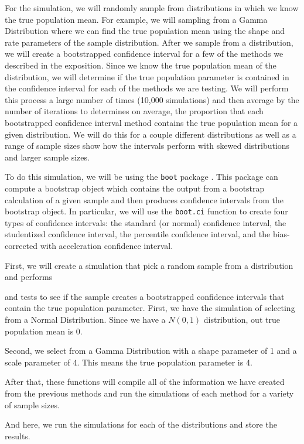 \documentclass[12pt]{article}
\begin{document}
For the simulation, we will randomly sample from distributions in which
we know the true population mean. For example, we will sampling from a
Gamma Distribution where we can find the true population mean using the
shape and rate parameters of the sample distribution. After we sample
from a distribution, we will create a bootstrapped confidence interval
for a few of the methods we described in the exposition. Since we know
the true population mean of the distribution, we will determine if the
true population parameter is contained in the confidence interval for
each of the methods we are testing. We will perform this process a large
number of times (10,000 simulations) and then average by the number of
iterations to determines on average, the proportion that each
bootstrapped confidence interval method contains the true population
mean for a given distribution. We will do this for a couple different
distributions as well as a range of sample sizes show how the intervals
perform with skewed distributions and larger sample sizes.

To do this simulation, we will be using the \texttt{boot} package
\citep{boot}. This package can compute a bootstrap object which contains
the output from a bootstrap calculation of a given sample and then
produces confidence intervals from the bootstrap object. In particular,
we will use the \texttt{boot.ci} function to create four types of
confidence intervals: the standard (or normal) confidence interval, the
studentized confidence interval, the percentile confidence interval, and
the bias-corrected with acceleration confidence interval.

First, we will create a simulation that pick a random sample from a
distribution and performs

and tests to see if the sample creates a bootstrapped confidence
intervals that contain the true population parameter. First, we have the
simulation of selecting from a Normal Distribution. Since we have a
\(N(0,1)\) distribution, out true population mean is 0.

Second, we select from a Gamma Distribution with a shape parameter of 1
and a scale parameter of 4. This means the true population parameter is
4.

After that, these functions will compile all of the information we have
created from the previous methods and run the simulations of each method
for a variety of sample sizes.

And here, we run the simulations for each of the distributions and store
the results.
\end{document}
